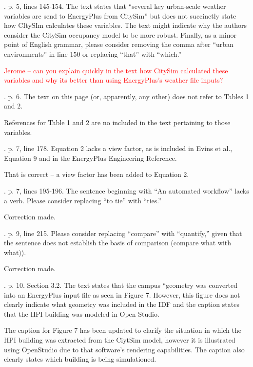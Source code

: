\documentclass[answers,12pt]{exam}
\begin{document}
\begin{questions}
. p. 5, lines 145-154.  The text states that “several key urban-scale weather variables are send to EnergyPlus from CitySim” but does not succinctly state how CItySIm calculates these variables.  The text might indicate why the authors consider the CitySim occupancy model to be more robust.  Finally, as a minor point of English grammar, please consider removing the comma after “urban environments” in line 150 or replacing “that” with “which.” 
\begin{solution}
\textcolor{red}{Jerome -- can you explain quickly in the text how CitySim calculated these variables and why its better than using EnergyPlus's weather file inputs?}
\end{solution}

. p. 6.  The text on this page (or, apparently, any other) does not refer to Tables 1 and 2. 
\begin{solution}
References for Table 1 and 2 are no included in the text pertaining to those variables.
\end{solution}

. p. 7, line 178.  Equation 2 lacks a view factor, as is included in Evins et al., Equation 9 and in the EnergyPlus Engineering Reference. 
\begin{solution}
That is correct -- a view factor has been added to Equation 2. 
\end{solution}

. p. 7, lines 195-196.  The sentence beginning with “An automated workflow” lacks a verb.  Please consider replacing “to tie” with “ties.” 
\begin{solution}
Correction made.
\end{solution}

. p. 9, line 215.  Please consider replacing “compare” with “quantify,” given that the sentence does not establish the basis of comparison (compare what with what)). 
\begin{solution}
Correction made.
\end{solution}

. p. 10. Section 3.2.  The text states that the campus “geometry was converted into an EnergyPlus input file as seen in Figure 7.  However, this figure does not clearly indicate what geometry was included in the IDF and the caption states that the HPI building was modeled in Open Studio.   
\begin{solution}
The caption for Figure 7 has been updated to clarify the situation in which the HPI building was extracted from the CiytSim model, however it is illustrated using
OpenStudio due to that software's rendering capabilities. The caption also clearly states which building is being simulationed.
\end{solution}


\end{questions}
\end{document}
